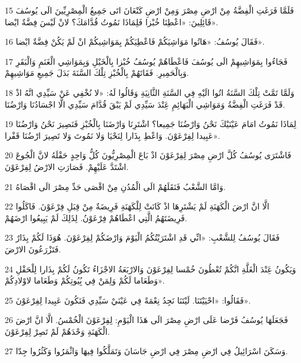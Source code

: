 \par 15 فَلَمَّا فَرَغَتِ الْفِضَّةُ مِنْ ارْضِ مِصْرَ وَمِنْ ارْضِ كَنْعَانَ اتَى جَمِيعُ الْمِصْرِيِّينَ الَى يُوسُفَ قَائِلِينَ: «اعْطِنَا خُبْزا فَلِمَاذَا نَمُوتُ قُدَّامَكَ؟ لانْ لَيْسَ فِضَّةٌ ايْضا».
\par 16 فَقَالَ يُوسُفُ: «هَاتُوا مَوَاشِيَكُمْ فَاعْطِيَكُمْ بِمَوَاشِيكُمْ انْ لَمْ يَكُنْ فِضَّةٌ ايْضا».
\par 17 فَجَاءُوا بِمَوَاشِيهِمْ الَى يُوسُفَ فَاعْطَاهُمْ يُوسُفُ خُبْزا بِالْخَيْلِ وَبِمَوَاشِي الْغَنَمِ وَالْبَقَرِ وَبِالْحَمِيرِ. فَقَاتَهُمْ بِالْخُبْزِ تِلْكَ السَّنَةَ بَدَلَ جَمِيعِ مَوَاشِيهِمْ.
\par 18 وَلَمَّا تَمَّتْ تِلْكَ السَّنَةُ اتُوا الَيْهِ فِي السَّنَةِ الثَّانِيَةِ وَقَالُوا لَهُ: «لا نُخْفِي عَنْ سَيِّدِي انَّهُ اذْ قَدْ فَرَغَتِ الْفِضَّةُ وَمَوَاشِي الْبَهَائِمِ عَِنْدَ سَيِّدِي لَمْ يَبْقَ قُدَّامَ سَيِّدِي الَّا اجْسَادُنَا وَارْضُنَا.
\par 19 لِمَاذَا نَمُوتُ امَامَ عَيْنَيْكَ نَحْنُ وَارْضُنَا جَمِيعا؟ اشْتَرِنَا وَارْضَنَا بِالْخُبْزِ فَنَصِيرَ نَحْنُ وَارْضُنَا عَبِيدا لِفِرْعَوْنَ. وَاعْطِ بِذَارا لِنَحْيَا وَلا نَمُوتَ وَلا تَصِيرَ ارْضُنَا قَفْرا».
\par 20 فَاشْتَرَى يُوسُفُ كُلَّ ارْضِ مِصْرَ لِفِرْعَوْنَ اذْ بَاعَ الْمِصْرِيُّونَ كُلُّ وَاحِدٍ حَقْلَهُ لانَّ الْجُوعَ اشْتَدَّ عَلَيْهِمْ. فَصَارَتِ الارْضُ لِفِرْعَوْنَ.
\par 21 وَامَّا الشَّعْبُ فَنَقَلَهُمْ الَى الْمُدُنِ مِنْ اقْصَى حَدِّ مِصْرَ الَى اقْصَاهُ.
\par 22 الَّا انَّ ارْضَ الْكَهَنَةِ لَمْ يَشْتَرِهَا اذْ كَانَتْ لِلْكَهَنَةِ فَرِيضَةٌ مِنْ قِبَلِ فِرْعَوْنَ. فَاكَلُوا فَرِيضَتَهُمُ الَّتِي اعْطَاهُمْ فِرْعَوْنُ. لِذَلِكَ لَمْ يَبِيعُوا ارْضَهُمْ.
\par 23 فَقَالَ يُوسُفُ لِلشَّعْبِ: «انِّي قَدِ اشْتَرَيْتُكُمُ الْيَوْمَ وَارْضَكُمْ لِفِرْعَوْنَ. هُوَذَا لَكُمْ بِذَارٌ فَتَزْرَعُونَ الارْضَ.
\par 24 وَيَكُونُ عَِنْدَ الْغَلَّةِ انَّكُمْ تُعْطُونَ خُمْسا لِفِرْعَوْنَ وَالارْبَعَةُ الاجْزَاءُ تَكُونُ لَكُمْ بِذَارا لِلْحَقْلِ وَطَعَاما لَكُمْ وَلِمَنْ فِي بُِيُوتِكُمْ وَطَعَاما لاوْلادِكُمْ».
\par 25 فَقَالُوا: «احْيَيْتَنَا. لَيْتَنَا نَجِدُ نِعْمَةً فِي عَيْنَيْ سَيِّدِي فَنَكُونَ عَبِيدا لِفِرْعَوْنَ».
\par 26 فَجَعَلَهَا يُوسُفُ فَرْضا عَلَى ارْضِ مِصْرَ الَى هَذَا الْيَوْمِ: لِفِرْعَوْنَ الْخُمْسُ. الَّا انَّ ارْضَ الْكَهَنَةِ وَحْدَهُمْ لَمْ تَصِرْ لِفِرْعَوْنَ.
\par 27 وَسَكَنَ اسْرَائِيلُ فِي ارْضِ مِصْرَ فِي ارْضِ جَاسَانَ وَتَمَلَّكُوا فِيهَا وَاثْمَرُوا وَكَثُرُوا جِدّا.
